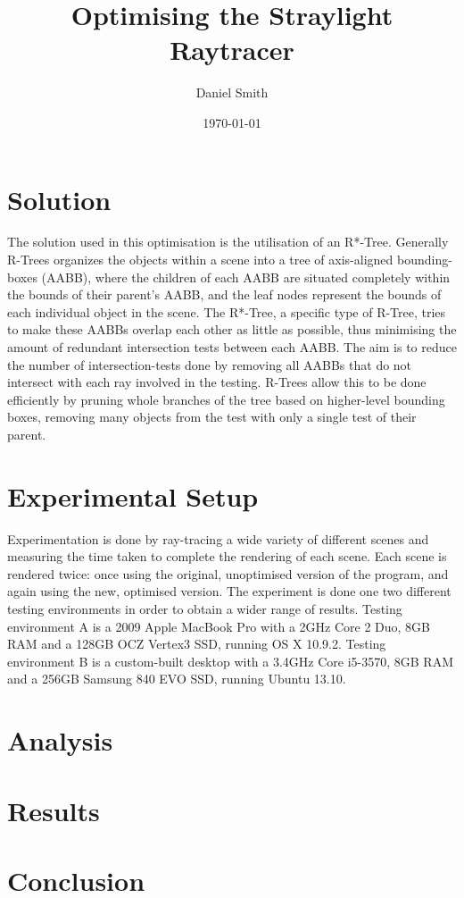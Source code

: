 \documentclass[a4paper]{article}
\title{Optimising the Straylight Raytracer}
\author{Daniel Smith}
\date{\today}
\begin{document}
\maketitle

\section{Solution}
The solution used in this optimisation is the utilisation of an R*-Tree. Generally R-Trees organizes the objects within a scene into a tree of axis-aligned bounding-boxes (AABB), where the children of each AABB are situated completely within the bounds of their parent's AABB, and the leaf nodes represent the bounds of each individual object in the scene. The R*-Tree, a specific type of R-Tree, tries to make these AABBs overlap each other as little as possible, thus minimising the amount of redundant intersection tests between each AABB. The aim is to reduce the number of intersection-tests done by removing all AABBs that do not intersect with each ray involved in the testing. R-Trees allow this to be done efficiently by pruning whole branches of the tree based on higher-level bounding boxes, removing many objects from the test with only a single test of their parent.

\section{Experimental Setup}
Experimentation is done by ray-tracing a wide variety of different scenes and measuring the time taken to complete the rendering of each scene. Each scene is rendered twice: once using the original, unoptimised version of the program, and again using the new, optimised version. The experiment is done one two different testing environments in order to obtain a wider range of results. Testing environment A is a 2009 Apple MacBook Pro with a 2GHz Core 2 Duo, 8GB RAM and a 128GB OCZ Vertex3 SSD, running OS X 10.9.2. Testing environment B is a custom-built desktop with a 3.4GHz Core i5-3570, 8GB RAM and a 256GB Samsung 840 EVO SSD, running Ubuntu 13.10.

\section{Analysis}

\section{Results}

\section{Conclusion}
\end{document}
